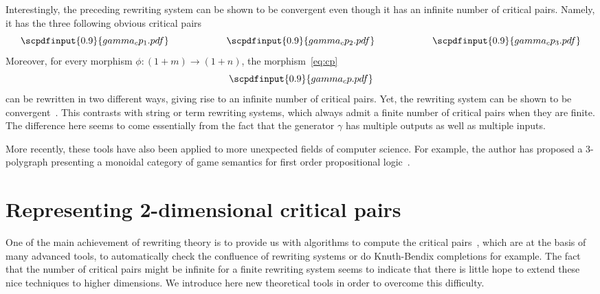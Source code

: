 \documentclass{LMCS}
\newcommand{\strid}[1]{\scpdfinput{0.9}{#1.pdf}}
\begin{document}
Interestingly, the preceding rewriting system can be shown to be convergent
even though it has an infinite number of critical pairs. Namely, it has the
three following obvious critical pairs
\begin{equation}
  \label{eq:ex-cp}
  \strid{gamma_cp_1}
  \qquad\qquad\qquad
  \strid{gamma_cp_2}
  \qquad\qquad\qquad
  \strid{gamma_cp_3}
\end{equation}
Moreover, for every morphism $\phi:(1+m)\to(1+n)$, the morphism~\eqref{eq:cp}
\begin{equation}
  \label{eq:cp}
  \strid{gamma_cp}
\end{equation}
can be rewritten in two different ways, giving rise to an infinite number of
critical pairs. Yet, the rewriting system can be shown to be
convergent~\cite{lafont:boolean-circuits}. This contrasts with string or term
rewriting systems, which always admit a finite number of critical pairs when
they are finite. The difference here seems to come essentially from the fact
that the generator $\gamma$ has multiple outputs as well as multiple inputs.

\bigskip

More recently, these tools have also been applied to more unexpected fields of
computer science. For example, the author has proposed a 3-polygraph presenting
a monoidal category of game semantics for first order propositional
logic~\cite{mimram:first-order-causality}.

\section{Representing 2-dimensional critical pairs}
\label{sec:repr-2-cp}
One of the main achievement of rewriting theory is to provide us with algorithms
to compute the critical pairs~\cite{baader-nipkow:trat}, which are at the basis
of many advanced tools, to automatically check the confluence of rewriting
systems or do Knuth-Bendix completions for example. The fact that the number of
critical pairs might be infinite for a finite rewriting system seems to indicate
that there is little hope to extend these nice techniques to higher
dimensions. We introduce here new theoretical tools in order to overcome this
difficulty.
\end{document}
